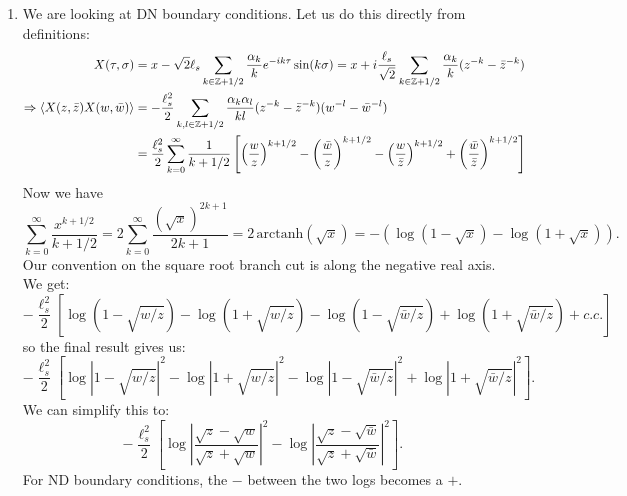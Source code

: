 \documentclass[11pt]{article}
\begin{document}
\begin{enumerate}
	We can also bosonize the $\eta, \xi$ theory in terms of an auxiliary bosonic field $\chi$, but this was not necessary for the exercise. 
	
	\item We are looking at DN boundary conditions. Let us do this directly from definitions:
	\[
	\begin{aligned}
		X(\tau, \sigma) &= x - \sqrt{2} \ell_s \sum_{k \in \mathbb Z + 1/2} \frac{\alpha_k}{k} e^{-i k \tau} \sin(k \sigma) = x + i \frac{\ell_s}{\sqrt 2} \sum_{k \in \mathbb Z + 1/2} \frac{\alpha_k}{k} (z^{-k} - \bar z^{-k})\\
		\Rightarrow \braket{X(z, \bar z) X(w, \bar w)} &= -\frac{\ell_s^2}{2} \sum_{k, l \in \mathbb Z + 1/2} \frac{\alpha_{k} \alpha_l}{k l} (z^{-k} - \bar z^{-k}) (w^{-l} - \bar w^{-l})\\
		&= \frac{\ell_s^2}{2} \sum_{k = 0}^\infty \frac{1}{k+1/2} \left[ \left(\frac{w}{z} \right)^{k+1/2} - \left(\frac{\bar w}{z} \right)^{k+1/2} - \left(\frac{w}{\bar z} \right)^{k+1/2} + \left(\frac{\bar w}{\bar z} \right)^{k+1/2} \right]
	\end{aligned}
	\]
	Now we have \[
		\sum_{k=0}^\infty \frac{x^{k+1/2}}{k+1/2} = 2 \sum_{k=0}^\infty \frac{(\sqrt x)^{2k+1}}{2k+1} = 2\, \mathrm{arctanh}(\sqrt{x}) = - ( \log(1-\sqrt x) - \log(1+\sqrt x)).
	\]
	Our convention on the square root branch cut is along the negative real axis. We get:
	\[
		-\frac{\ell_s^2}{2} \left[\log(1 - \sqrt{w/z}) - \log(1 + \sqrt{w/z})  - \log(1 - \sqrt{\bar w/z}) + \log(1 + \sqrt{\bar w/z}) + c.c. \right]
	\]
	so the final result gives us:
	\[
		- \frac{\ell_s^2}{2} \left[ \log|1 - \sqrt{w/z}|^2 - \log|1 + \sqrt{w/z}|^2 - \log|1 - \sqrt{\bar w/z}|^2 +  \log|1 + \sqrt{\bar w/z}|^2 \right].
	\]
	We can simplify this to:
	\[
		- \frac{\ell_s^2}{2} \left[ \log|\frac{\sqrt{z} - \sqrt{w}}{\sqrt{z} + \sqrt{w}}|^2 - \log|\frac{\sqrt{z} - \sqrt{\bar w}}{\sqrt z + \sqrt{\bar w}}|^2 \right].
	\]
	For ND boundary conditions, the $-$ between the two logs becomes a $+$.
	

\end{enumerate}
\end{document}
